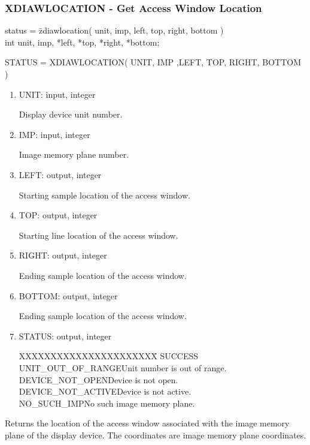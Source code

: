 \subsubsection{XDIAWLOCATION - Get Access Window Location}
\begin{tabbing}
status = \=zdiawlocation( unit, imp, left, top, right, bottom )\\
\>int  unit, imp, *left, *top, *right, *bottom;\\
\end{tabbing}
STATUS = XDIAWLOCATION( UNIT, IMP ,LEFT, TOP, RIGHT, BOTTOM )
\begin{enumerate}
\item UNIT:  input, integer

Display device unit number.
\item IMP:  input, integer

Image memory plane number.
\item LEFT:  output, integer

Starting sample location of the access window.
\item TOP:  output, integer

Starting line location of the access window.
\item RIGHT:  output, integer

Ending sample location of the access window.
\item BOTTOM:  output, integer

Ending sample location of the access window.
\item STATUS:  output, integer
\begin{tabbing}
XXXXXXXXXXXXXXXXXXXXXX\=\kill
SUCCESS\\
UNIT\_OUT\_OF\_RANGE\>Unit number is out of range.\\
DEVICE\_NOT\_OPEN\>Device is not open.\\
DEVICE\_NOT\_ACTIVE\>Device is not active.\\
NO\_SUCH\_IMP\>No such image memory plane.\\
\end{tabbing}
\end{enumerate}
Returns the location of the access window associated with the image
memory plane of the display device.  The coordinates are image memory
plane coordinates.
\newpage
